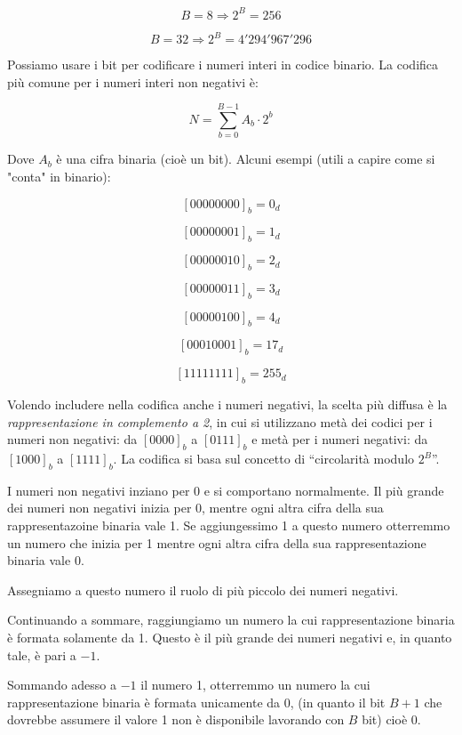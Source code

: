 \documentclass{article}
\begin{document}
\[B = 8 \Rightarrow 2^B = 256\]

\[B = 32 \Rightarrow 2^B = 4'294'967'296\]

Possiamo usare i bit per codificare i numeri interi in codice binario. La codifica più comune per i numeri interi non negativi è:

\[N = \sum^{B - 1}_{b = 0} A_b \cdot 2^b\]

Dove $A_b$ è una cifra binaria (cioè un bit). Alcuni esempi (utili a capire come si "conta" in binario):

\[ [00000000]_b = 0_d\]

\[[00000001]_b = 1_d\]

\[[00000010]_b = 2_d\]

\[[00000011]_b = 3_d\]

\[[00000100]_b = 4_d\]

\[ [00010001]_b = 17_d\]

\[ [11111111]_b = 255_d\]

Volendo includere nella codifica anche i numeri negativi, la scelta più diffusa è la \textit{rappresentazione in complemento a 2}, in cui si utilizzano metà dei codici per i numeri non negativi: da $[0000]_b$ a $[0111]_b$ e metà per i numeri negativi: da $[1000]_b$ a $[1111]_b$. La codifica si basa sul concetto di ``circolarità modulo $2^B$''.

\vspace{3mm}

I numeri non negativi inziano per 0 e si comportano normalmente. Il più grande dei numeri non negativi inizia per 0, mentre ogni altra cifra della sua rappresentazoine binaria vale 1. Se aggiungessimo 1 a questo numero otterremmo un numero che inizia per 1 mentre ogni altra cifra della sua rappresentazione binaria vale 0. 

\vspace{3mm}

Assegniamo a questo numero il ruolo di più piccolo dei numeri negativi. 

\vspace{1mm}

Continuando a sommare, raggiungiamo un numero la cui rappresentazione binaria è formata solamente da 1. Questo è il più grande dei numeri negativi e, in quanto tale, è pari a $-1$. 

\vspace{1mm}

Sommando adesso a $-1$ il numero 1, otterremmo un numero la cui rappresentazione binaria è formata unicamente da 0, (in quanto il bit $B+1$ che dovrebbe assumere il valore 1 non è disponibile lavorando con $B$ bit) cioè 0. 
\end{document}
